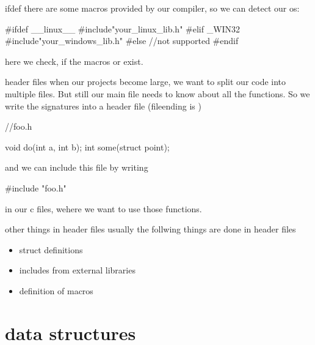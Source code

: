 \documentclass[10pt,graphics,aspectratio=169,table]{beamer}
\begin{document}
\begin{frame}[fragile]{ifdef}
there are some macros provided by our compiler, so we can detect our os:
\begin{codeblock}
#ifdef __linux__
    #include"your_linux_lib.h"
#elif _WIN32
    #include"your_windows_lib.h" 
#else
    //not supported
#endif
\end{codeblock}

here we check, if the macros  or  exist.
\end{frame}

\begin{frame}[fragile]{header files}
when our projects become large, we want to split our code into multiple files.
But still our main file needs to know about all the functions. So we write the
signatures into a header file (fileending is )

\begin{codeblock}
//foo.h

void do(int a, int b);
int some(struct point);
\end{codeblock}

and we can include this file by writing
\begin{codeblock}
#include "foo.h"
\end{codeblock}
in our c files, wehere we want to use those functions.
\end{frame}

\begin{frame}{other things in header files}
usually the follwing things are done in header files
\begin{itemize}
\item struct definitions
\item includes from external libraries
\item definition of macros
\end{itemize}
\end{frame}

\section{data structures}
\end{document}
